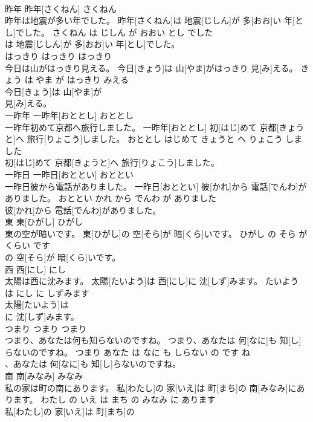 \documentclass[8pt]{extreport}
\begin{document}
\begin{CJK}{UTF8}{min}
\\	昨年	昨年[さくねん]	さくねん	
\\	昨年は地震が多い年でした。	昨年[さくねん]は 地震[じしん]が 多[おお]い 年[とし]でした。	さくねん は じしん が おおい とし でした	
\\	は 地震[じしん]が 多[おお]い 年[とし]でした。		
\\	はっきり	はっきり	はっきり	
\\	今日は山がはっきり見える。	今日[きょう]は 山[やま]がはっきり 見[み]える。	きょう は やま が はっきり みえる	
\\	今日[きょう]は 山[やま]が
\\	見[み]える。		
\\	一昨年	一昨年[おととし]	おととし	
\\	一昨年初めて京都へ旅行しました。	一昨年[おととし] 初[はじ]めて 京都[きょうと]へ 旅行[りょこう]しました。	おととし はじめて きょうと へ りょこう しました	
\\	初[はじ]めて 京都[きょうと]へ 旅行[りょこう]しました。		
\\	一昨日	一昨日[おととい]	おととい	
\\	一昨日彼から電話がありました。	一昨日[おととい] 彼[かれ]から 電話[でんわ]がありました。	おととい かれ から でんわ が ありました	
\\	彼[かれ]から 電話[でんわ]がありました。		
\\	東	東[ひがし]	ひがし	
\\	東の空が暗いです。	東[ひがし]の 空[そら]が 暗[くら]いです。	ひがし の そら が くらい です	
\\	の 空[そら]が 暗[くら]いです。		
\\	西	西[にし]	にし	
\\	太陽は西に沈みます。	太陽[たいよう]は 西[にし]に 沈[しず]みます。	たいよう は にし に しずみます	
\\	太陽[たいよう]は
\\	に 沈[しず]みます。		
\\	つまり	つまり	つまり	
\\	つまり、あなたは何も知らないのですね。	つまり、あなたは 何[なに]も 知[し]らないのですね。	つまり あなた は なに も しらない の です ね	
\\	、あなたは 何[なに]も 知[し]らないのですね。		
\\	南	南[みなみ]	みなみ	
\\	私の家は町の南にあります。	私[わたし]の 家[いえ]は 町[まち]の 南[みなみ]にあります。	わたし の いえ は まち の みなみ に あります	
\\	私[わたし]の 家[いえ]は 町[まち]の

\end{CJK}
\end{document}
